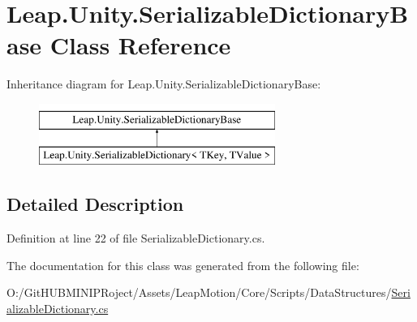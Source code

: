 \hypertarget{class_leap_1_1_unity_1_1_serializable_dictionary_base}{}\section{Leap.\+Unity.\+Serializable\+Dictionary\+Base Class Reference}
\label{class_leap_1_1_unity_1_1_serializable_dictionary_base}
Inheritance diagram for Leap.\+Unity.\+Serializable\+Dictionary\+Base\+:\begin{figure}[H]
\begin{center}
\leavevmode
\includegraphics[height=2.000000cm]{class_leap_1_1_unity_1_1_serializable_dictionary_base}
\end{center}
\end{figure}


\subsection{Detailed Description}


Definition at line 22 of file Serializable\+Dictionary.\+cs.



The documentation for this class was generated from the following file\+:\begin{DoxyCompactItemize}
\item 
O\+:/\+Git\+H\+U\+B\+M\+I\+N\+I\+P\+Roject/\+Assets/\+Leap\+Motion/\+Core/\+Scripts/\+Data\+Structures/\mbox{\hyperlink{_serializable_dictionary_8cs}{Serializable\+Dictionary.\+cs}}\end{DoxyCompactItemize}
